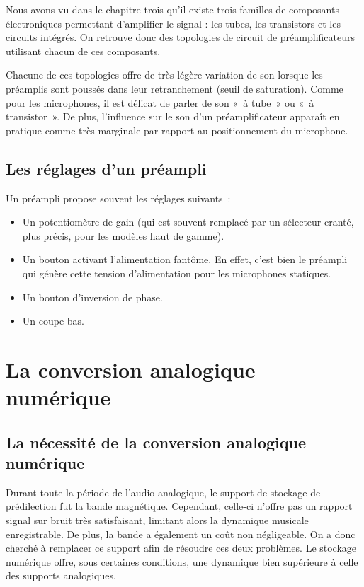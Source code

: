 \documentclass[
  letterpaper,
  DIV=11,
  numbers=noendperiod]{scrreprt}
\providecommand{\tightlist}{%
  \setlength{\itemsep}{0pt}\setlength{\parskip}{0pt}}\usepackage{longtable,booktabs,array}
\begin{document}
Nous avons vu dans le chapitre trois qu'il existe trois familles de
composants électroniques permettant d'amplifier le signal : les tubes,
les transistors et les circuits intégrés. On retrouve donc des
topologies de circuit de préamplificateurs utilisant chacun de ces
composants.

Chacune de ces topologies offre de très légère variation de son lorsque
les préamplis sont poussés dans leur retranchement (seuil de
saturation). Comme pour les microphones, il est délicat de parler de son
«~à tube~» ou «~à transistor~». De plus, l'influence sur le son d'un
préamplificateur apparaît en pratique comme très marginale par rapport
au positionnement du microphone.

\hypertarget{les-ruxe9glages-dun-pruxe9ampli}{%
\section{Les réglages d'un
préampli}\label{les-ruxe9glages-dun-pruxe9ampli}}

Un préampli propose souvent les réglages suivants~:

\begin{itemize}
\tightlist
\item
  Un potentiomètre de gain (qui est souvent remplacé par un sélecteur
  cranté, plus précis, pour les modèles haut de gamme).
\item
  Un bouton activant l'alimentation fantôme. En effet, c'est bien le
  préampli qui génère cette tension d'alimentation pour les microphones
  statiques.
\item
  Un bouton d'inversion de phase.
\item
  Un coupe-bas.
\end{itemize}

\hypertarget{la-conversion-analogique-numuxe9rique}{%
\chapter{La conversion analogique
numérique}\label{la-conversion-analogique-numuxe9rique}}

\hypertarget{la-nuxe9cessituxe9-de-la-conversion-analogique-numuxe9rique}{%
\section{La nécessité de la conversion analogique
numérique}\label{la-nuxe9cessituxe9-de-la-conversion-analogique-numuxe9rique}}

Durant toute la période de l'audio analogique, le support de stockage de
prédilection fut la bande magnétique. Cependant, celle-ci n'offre pas un
rapport signal sur bruit très satisfaisant, limitant alors la dynamique
musicale enregistrable. De plus, la bande a également un coût non
négligeable. On a donc cherché à remplacer ce support afin de résoudre
ces deux problèmes. Le stockage numérique offre, sous certaines
conditions, une dynamique bien supérieure à celle des supports
analogiques.
\end{document}
